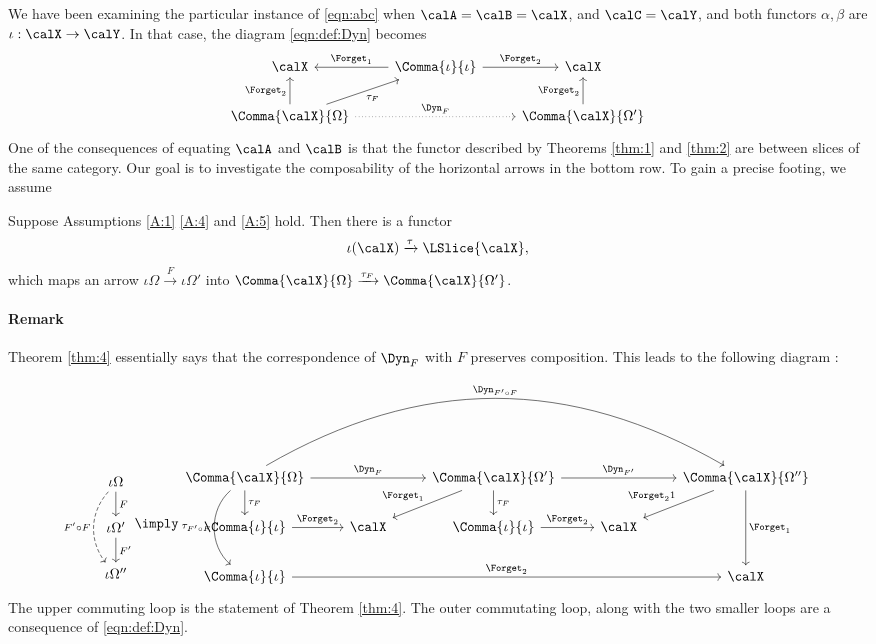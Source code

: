 \documentclass[12pt,oneside]{article}
\begin{document}
We have been examining the particular instance of \eqref{eqn:abc} when $\calA = \calB = \calX$, and $\calC = \calY$, and both functors $\alpha, \beta$ are  $\iota : \calX \to \calY$. In that case, the diagram \eqref{eqn:def:Dyn} becomes
%
\[\begin{tikzcd}
	\calX & \Comma{\iota}{\iota} \arrow[l, "\Forget_1"'] \arrow[r, "\Forget_2"] & \calX \\
	\Comma{\calX}{\Omega} \arrow[u, "\Forget_2"] \arrow[ru, "\tau_F"'] \arrow[rr, "\Dyn_F", dotted] & & \Comma{\calX}{\Omega'} \arrow[u, "\Forget_2"]
\end{tikzcd}\]
%
One of the consequences of equating $\calA$ and $\calB$ is that the functor described by Theorems \ref{thm:1} and \ref{thm:2} are between slices of the same category. Our goal is to investigate the composability of the horizontal arrows in the bottom row. To gain a precise footing, we assume
%


\begin{figure}[omitted: a diagram of this paper's results, not reproduced here]\label{fig:outline1}\end{figure}

\begin{theorem} \label{thm:4}
	Suppose Assumptions \ref{A:1} \ref{A:4} and \ref{A:5} hold. Then there is a functor 
	\[ \iota(\calX) \xrightarrow{\tau} \LSlice{ \calX } , \]
	which maps an arrow $\iota \Omega \xrightarrow{F} \iota \Omega'$ into $\Comma{\calX}{\Omega} \xrightarrow{\tau_F} \Comma{\calX}{\Omega'}$.
\end{theorem}

\paragraph{Remark} Theorem \ref{thm:4} essentially says that the correspondence of $\Dyn_F$ with $F$ preserves composition. This leads to the following diagram :
%
\[ \begin{tikzcd} \iota \Omega \arrow[dashed,  bend right = 40]{dd}[swap]{F'\circ F} \arrow{d}{F} \\ \iota \Omega' \arrow{d}{F'} \\ \iota \Omega'' \end{tikzcd} \imply 
\begin{tikzcd}
	\Comma{\calX}{\Omega} \arrow[d, "\tau_F"] \arrow[rr, "\Dyn_F"] \arrow[dd, "\tau_{F'\circ F}"', bend right=49] \arrow[rrrr, "\Dyn_{F'\circ F}", bend left=30] & & \Comma{\calX}{\Omega'} \arrow[d, "\tau_F"] \arrow[ld, "\Forget_1"'] \arrow[rr, "\Dyn_{F'}"] & & \Comma{\calX}{\Omega''} \arrow[ld, "\Forget_21"'] \arrow[dd, "\Forget_1"] \\
	\Comma{\iota}{\iota} \arrow[r, "\Forget_2"] & \calX & \Comma{\iota}{\iota} \arrow[r, "\Forget_2"] & \calX & \\
	\Comma{\iota}{\iota} \arrow[rrrr, "\Forget_2"] & & & & \calX 
\end{tikzcd}\]
%
The upper commuting loop is the statement of Theorem \ref{thm:4}. The outer commutating loop, along with the two smaller loops are a consequence of \eqref{eqn:def:Dyn}.
\end{document}
